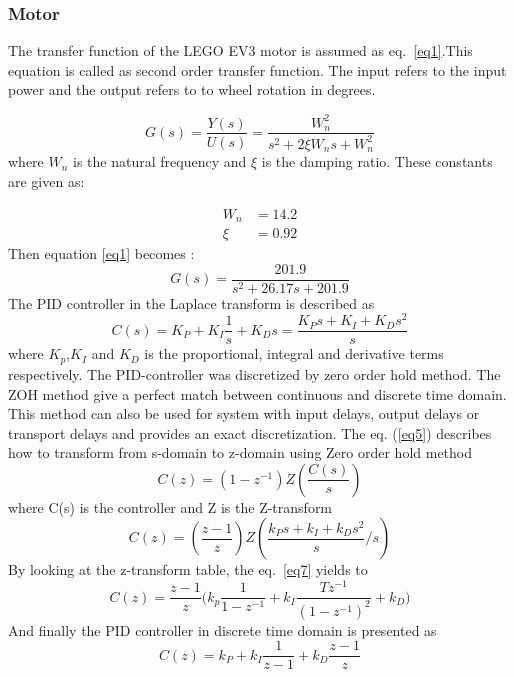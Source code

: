 \subsubsection{Motor}
The transfer function of the LEGO EV3 motor is assumed as eq.~\eqref{eq1}.This equation is called as second order transfer function. The input refers to the input power and the output refers to to wheel rotation in degrees.

\begin{equation}\label{eq1}
    G(s)=\frac{Y(s)}{U(s)}=\frac{W_n^2}{s^2+2\xi W_n s + W_n^2}
\end{equation}
where $W_n$ is the natural frequency and $\xi$ is the damping ratio.  These constants are given as:

\begin{equation}
\begin{split}
     W_n & = 14.2 \\
    \xi & = 0.92 
\end{split}
\end{equation}
Then equation \ref{eq1} becomes : 
\begin{equation}
    G(s)=\frac{201.9}{s^2+26.17s+201.9}
\end{equation}
The PID controller in the Laplace transform is described as 
    \begin{equation}
    C(s)= K_P+K_I \frac{1}{s}+K_Ds= \frac{K_Ps+K_I+K_Ds^2}{s}
\end{equation}
where $K_p$,$K_I$ and $K_D$ is the proportional, integral and derivative terms respectively.
The PID-controller was discretized by zero order hold method. The ZOH method give a perfect match between continuous and discrete time domain. This method can also be used for system with input delays, output delays or transport delays and provides an exact discretization. 
The eq. (\ref{eq5}) describes how to transform from s-domain to z-domain using Zero order hold method
\begin{equation} \label{eq5}
    C(z)=(1-z^{-1}) Z(\frac{C(s)}{s}) 
\end{equation}
where C(s) is the controller and Z is the Z-transform
\begin{equation}
    C(z)=(\frac{z-1}{z})Z(\frac{k_Ps+k_I+k_Ds^2}{s} \Big/ s)
    \label{eq7}
\end{equation}
By looking at the z-transform table, the eq.~\eqref{eq7} yields to
\begin{equation}
    C(z)=\frac{z-1}{z}\bigg( k_p \frac{1}{1-z^{-1}}+k_I \frac{T z^{-1}}{(1-z^{-1})^2}+k_D\bigg)
\end{equation}
And finally the PID controller in discrete time domain is presented as
\begin{equation}
    C(z)= k_P + k_I \frac{1}{z-1} + k_D \frac{z-1}{z}
\end{equation}

